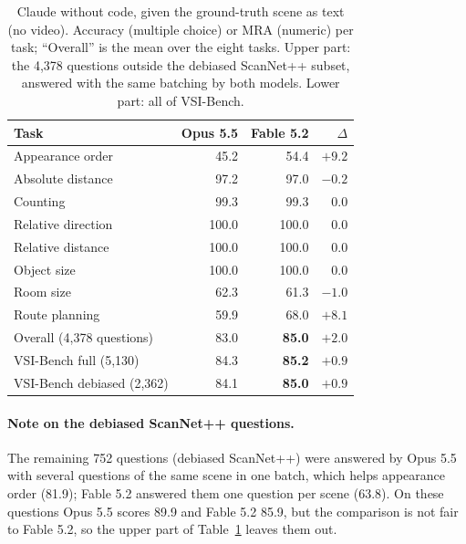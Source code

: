 \begin{table}[t]
\centering
\caption{Claude without code, given the ground-truth scene as text (no video). Accuracy (multiple choice) or
MRA (numeric) per task; ``Overall'' is the mean over the eight tasks. Upper part: the 4,378 questions outside the
debiased ScanNet++ subset, answered with the same batching by both models. Lower part: all of VSI-Bench.}
\label{tab:agent-fable-opus}
\begin{tabular}{lrrr}
\toprule
Task & Opus 5.5 & Fable 5.2 & $\Delta$ \\
\midrule
Appearance order   & 45.2  & 54.4  & $+9.2$ \\
Absolute distance  & 97.2  & 97.0  & $-0.2$ \\
Counting           & 99.3  & 99.3  & $0.0$ \\
Relative direction & 100.0 & 100.0 & $0.0$ \\
Relative distance  & 100.0 & 100.0 & $0.0$ \\
Object size        & 100.0 & 100.0 & $0.0$ \\
Room size          & 62.3  & 61.3  & $-1.0$ \\
Route planning     & 59.9  & 68.0  & $+8.1$ \\
\midrule
Overall (4,378 questions) & 83.0 & \textbf{85.0} & $+2.0$ \\
\midrule
VSI-Bench full (5,130)        & 84.3 & \textbf{85.2} & $+0.9$ \\
VSI-Bench debiased (2,362)    & 84.1 & \textbf{85.0} & $+0.9$ \\
\bottomrule
\end{tabular}
\end{table}

\paragraph{Note on the debiased ScanNet++ questions.}
The remaining 752 questions (debiased ScanNet++) were answered by Opus 5.5 with several questions of the same
scene in one batch, which helps appearance order (81.9); Fable 5.2 answered them one question per scene (63.8).
On these questions Opus 5.5 scores 89.9 and Fable 5.2 85.9, but the comparison is not fair to Fable 5.2, so the
upper part of Table~\ref{tab:agent-fable-opus} leaves them out.

